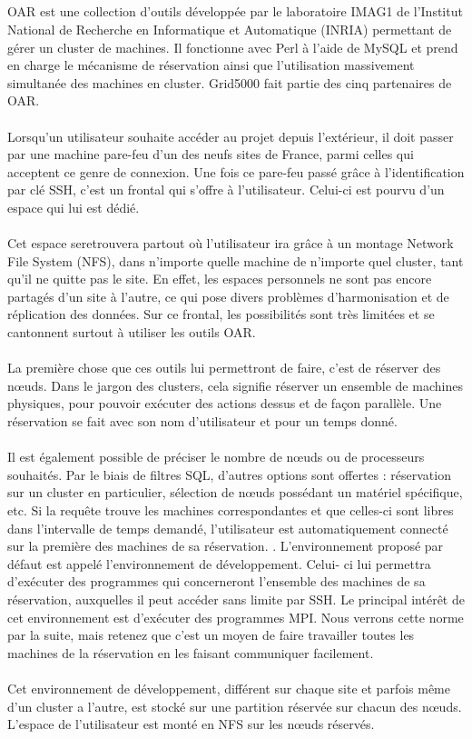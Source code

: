 \documentclass[a4paper, 10pt, onecolumn]{report}
\begin{document}
\subsection{}
OAR est une collection d’outils développée par le laboratoire IMAG1 de l’Institut National
de Recherche en Informatique et Automatique (INRIA) permettant de gérer un cluster de
machines. Il fonctionne avec Perl à l’aide de MySQL et prend en charge le mécanisme de
réservation ainsi que l’utilisation massivement simultanée des machines en cluster. Grid5000
fait partie des cinq partenaires de OAR.\\
\\
Lorsqu’un utilisateur souhaite accéder au projet depuis l’extérieur, il doit passer par une
machine pare-feu d’un des neufs sites de France, parmi celles qui acceptent ce genre de
connexion. Une fois ce pare-feu passé grâce à l’identification par clé SSH, c’est un frontal
qui s’offre à l’utilisateur. Celui-ci est pourvu d’un espace qui lui est dédié.\\
\\
Cet espace seretrouvera partout où l’utilisateur ira grâce à un montage Network File System (NFS), dans
n’importe quelle machine de n’importe quel cluster, tant qu’il ne quitte pas le site. En effet,
les espaces personnels ne sont pas encore partagés d’un site à l’autre, ce qui pose divers
problèmes d’harmonisation et de réplication des données. Sur ce frontal, les possibilités sont
très limitées et se cantonnent surtout à utiliser les outils OAR. \\
\\
La première chose que ces outils lui permettront de faire, c’est de réserver des nœuds. Dans le jargon des clusters, cela signifie
réserver un ensemble de machines physiques, pour pouvoir exécuter des actions dessus et
de façon parallèle. Une réservation se fait avec son nom d’utilisateur et pour un temps donné.\\
\\
Il est également possible de préciser le nombre de nœuds ou de processeurs souhaités. Par
le biais de filtres SQL, d’autres options sont offertes : réservation sur un cluster en particulier,
sélection de nœuds possédant un matériel spécifique, etc. Si la requête trouve les machines
correspondantes et que celles-ci sont libres dans l’intervalle de temps demandé, l’utilisateur est
automatiquement connecté sur la première des machines de sa réservation.
. L’environnement proposé par défaut est appelé l’environnement de développement. Celui-
ci lui permettra d’exécuter des programmes qui concerneront l’ensemble des machines de
sa réservation, auxquelles il peut accéder sans limite par SSH. Le principal intérêt de cet
environnement est d’exécuter des programmes MPI. Nous verrons cette norme par la suite,
mais retenez que c’est un moyen de faire travailler toutes les machines de la réservation en les
faisant communiquer facilement.\\
\\
Cet environnement de développement, différent sur chaque site et parfois même d’un cluster a
l’autre, est stocké sur une partition réservée sur chacun des nœuds. L’espace de l’utilisateur est
monté en NFS sur les nœuds réservés.
\end{document}
